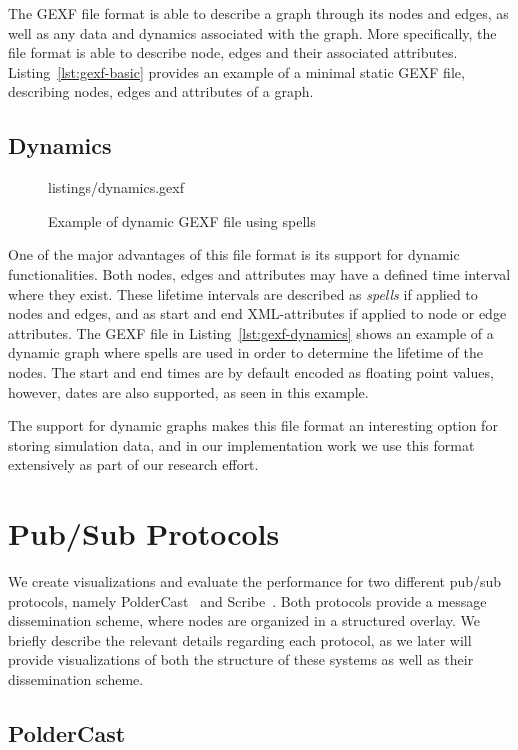 The GEXF file format is able to describe a graph through its nodes and
edges, as well as any data and dynamics associated with the graph. More
specifically, the file format is able to describe node, edges and their
associated attributes. Listing~\ref{lst:gexf-basic} provides an example
of a minimal static GEXF file, describing nodes, edges and attributes of
a graph.

\subsection{Dynamics}

\begin{figure}[h]
 {listings/dynamics.gexf}
\caption{Example of  dynamic GEXF file using spells}
\end{figure}

One of the major advantages of this file format is its support for
dynamic functionalities.  Both nodes, edges and attributes may have a
defined time interval where they exist. These lifetime intervals are
described as \emph{spells} if applied to nodes and edges, and as start
and end XML-attributes if applied to node or edge attributes. The
GEXF file in Listing~\ref{lst:gexf-dynamics} shows an example of a
dynamic graph where spells are used in order to determine the lifetime
of the nodes. The start and end times are by default encoded as
floating point values, however, dates are also supported, as seen in this example.

The support for dynamic graphs makes this file format an interesting
option for storing simulation data, and in our implementation work we
use this format extensively as part of our research effort.


\section{Pub/Sub Protocols} We create visualizations and evaluate the
performance for two different pub/sub protocols, namely
PolderCast~\cite{Setty:2012} and Scribe~\cite{Voulgaris:2005}. Both
protocols provide a message dissemination scheme, where nodes are
organized in a structured overlay. We briefly describe the relevant
details regarding each protocol, as we later will provide visualizations
of both the structure of these systems as well as their dissemination
scheme.

\subsection{PolderCast}

